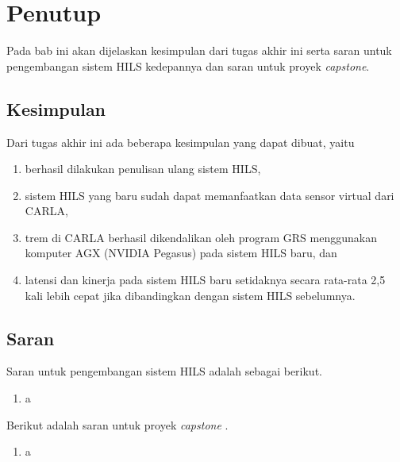 \chapter{Penutup}\label{chapter-5}

Pada bab ini akan dijelaskan kesimpulan dari tugas akhir ini serta saran untuk
pengembangan sistem HILS kedepannya dan saran untuk proyek \textit{capstone}.

\section{Kesimpulan}

Dari tugas akhir ini ada beberapa kesimpulan yang dapat dibuat, yaitu
\begin{enumerate}
	\item berhasil dilakukan penulisan ulang sistem HILS,
	\item sistem HILS yang baru sudah dapat memanfaatkan data sensor virtual
	dari CARLA,
	\item trem di CARLA berhasil dikendalikan oleh program GRS menggunakan
	komputer AGX (NVIDIA Pegasus) pada sistem HILS baru, dan
	\item latensi dan kinerja pada sistem HILS baru setidaknya secara rata-rata
	2,5 kali lebih cepat jika dibandingkan dengan sistem HILS sebelumnya.
\end{enumerate}

\section{Saran}

Saran untuk pengembangan sistem HILS adalah sebagai berikut.
\begin{enumerate}
	\item a
\end{enumerate}

Berikut adalah saran untuk proyek \textit{capstone} \capstoneTitle.
\begin{enumerate}
	\item a
\end{enumerate}
